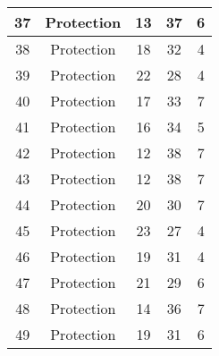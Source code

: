 \documentclass[results.tex]{subfiles}
\begin{document}
\begin{center}
\begin{tabular}{| c || c | c | c | c |}
            \hline
            37                      & Protection                   & 13                     & 37                      & 6                    \\
            \hline
            38                      & Protection                   & 18                     & 32                      & 4                    \\
            \hline
            39                      & Protection                   & 22                     & 28                      & 4                    \\
            \hline
            40                      & Protection                   & 17                     & 33                      & 7                    \\
            \hline
            41                      & Protection                   & 16                     & 34                      & 5                    \\
            \hline
            42                      & Protection                   & 12                     & 38                      & 7                    \\
            \hline
            43                      & Protection                   & 12                     & 38                      & 7                    \\
            \hline
            44                      & Protection                   & 20                     & 30                      & 7                    \\
            \hline
            45                      & Protection                   & 23                     & 27                      & 4                    \\
            \hline
            46                      & Protection                   & 19                     & 31                      & 4                    \\
            \hline
            47                      & Protection                   & 21                     & 29                      & 6                    \\
            \hline
            48                      & Protection                   & 14                     & 36                      & 7                    \\
            \hline
            49                      & Protection                   & 19                     & 31                      & 6                    \\
            \hline
        \end{tabular}
    \end{center}
\end{document}
